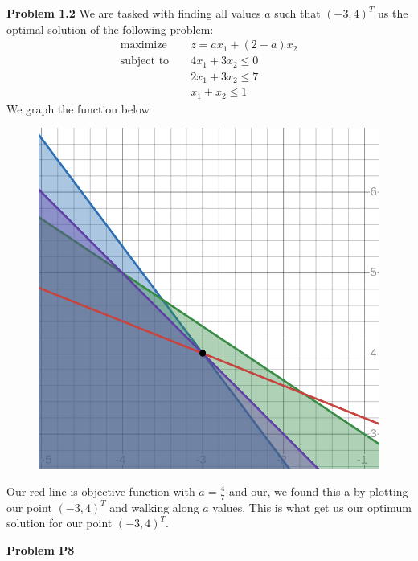 \documentclass{article}
\begin{document}
\textbf{Problem 1.2} We are tasked with finding all values $a$ such that $(-3,4)^T$ us the optimal solution of the following problem:
\begin{align*}
  \text{maximize } && z = ax_1 + (2-a)x_2 \\
  \text{subject to } && 4x_1 + 3x_2 \leq 0 \\
  && 2x_1 + 3x_2 \leq 7 \\ 
  && x_1 + x_2 \leq 1
\end{align*}
We graph the function below
\begin{figure}[H]
    \centering
    \includegraphics[scale = 0.35]{1.2.png}
\end{figure}
Our red line is objective function with $a = \frac{4}{7}$ and our, we found this a by plotting our point $(-3,4)^T$ and walking along $a$ values. This is what get us our optimum solution for our point $(-3,4)^T$.

\textbf{Problem P8}
\end{document}
